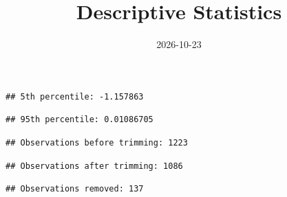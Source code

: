 \documentclass[
]{article}
\title{Descriptive Statistics}
\author{}
\date{\vspace{-2.5em}2026-10-23}
\begin{document}
\maketitle

\begin{verbatim}
## 5th percentile: -1.157863
\end{verbatim}

\begin{verbatim}
## 95th percentile: 0.01086705
\end{verbatim}

\begin{verbatim}
## Observations before trimming: 1223
\end{verbatim}

\begin{verbatim}
## Observations after trimming: 1086
\end{verbatim}

\begin{verbatim}
## Observations removed: 137
\end{verbatim}
\end{document}
